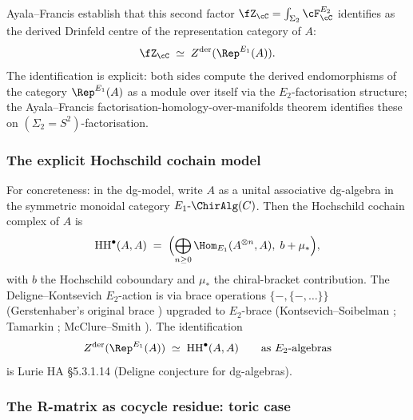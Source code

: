 Ayala--Francis \cite[\S 3.1]{AyalaFrancis2015} establish that this
second factor
$\fZ_\cC = \int_{\Sigma_2} \cF^{E_2}_\cC$ identifies as the derived
Drinfeld centre of the representation category of $A$:
\[
 \fZ_\cC \;\simeq\; Z^{\mathrm{der}}(\Rep^{E_1}(A)).
\]
The identification is explicit: both sides compute the derived
endomorphisms of the category $\Rep^{E_1}(A)$ as a module over itself
via the $E_2$-factorisation structure; the Ayala--Francis
factorisation-homology-over-manifolds theorem identifies these on
$(\Sigma_2 = S^2)$-factorisation.

\subsubsection*{The explicit Hochschild cochain model}

For concreteness: in the dg-model, write $A$ as a unital associative
dg-algebra in the symmetric monoidal category $E_1\text{-}\ChirAlg(C)$.
Then the Hochschild cochain complex of $A$ is
\[
 \mathrm{HH}^\bullet(A, A) \;=\;
 \Bigl(\bigoplus_{n \geq 0} \Hom_{E_1}(A^{\otimes n}, A),
 \; b + \mu_* \Bigr),
\]
with $b$ the Hochschild coboundary and $\mu_*$ the chiral-bracket
contribution.  The Deligne--Kontsevich $E_2$-action is via brace
operations $\{-,\{-,\ldots\}\}$ (Gerstenhaber's original brace
\cite{Gerstenhaber}) upgraded to $E_2$-brace (Kontsevich--Soibelman
\cite{KontsevichSoibelmanDefI}; Tamarkin \cite{TamarkinDGCat};
McClure--Smith \cite{McClureSmith}).  The identification
\[
 Z^{\mathrm{der}}(\Rep^{E_1}(A)) \;\simeq\; \mathrm{HH}^\bullet(A, A)
 \qquad \text{as } E_2\text{-algebras}
\]
is Lurie HA \S5.3.1.14 (Deligne conjecture for dg-algebras).

\subsubsection*{The R-matrix as cocycle residue: toric case}

